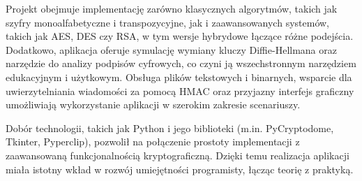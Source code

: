 \documentclass[12pt,a4paper]{article}
\begin{document}
\noindent Projekt obejmuje implementację zarówno klasycznych algorytmów, takich jak szyfry monoalfabetyczne i transpozycyjne, jak i zaawansowanych systemów, takich jak AES, DES czy RSA, w tym wersje hybrydowe łączące różne podejścia. Dodatkowo, aplikacja oferuje symulację wymiany kluczy Diffie-Hellmana oraz narzędzie do analizy podpisów cyfrowych, co czyni ją wszechstronnym narzędziem edukacyjnym i użytkowym. Obsługa plików tekstowych i binarnych, wsparcie dla uwierzytelniania wiadomości za pomocą HMAC oraz przyjazny interfejs graficzny umożliwiają wykorzystanie aplikacji w szerokim zakresie scenariuszy.\newline

\noindent Dobór technologii, takich jak Python i jego biblioteki (m.in. PyCryptodome, Tkinter, Pyperclip), pozwolił na połączenie prostoty implementacji z zaawansowaną funkcjonalnością kryptograficzną. Dzięki temu realizacja aplikacji miała istotny wkład w rozwój umiejętności programisty, łącząc teorię z praktyką.
\end{document}
